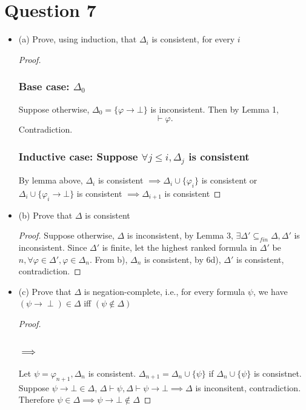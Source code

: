\documentclass{article}
\begin{document}
\section*{Question 7}
\begin{itemize}
    \item (a) Prove, using induction, that $\Delta_i$ is consistent, for every $i$
    \begin{proof}
        \subsubsection*{Base case: $\Delta_0$}
        Suppose otherwise, $\Delta_0=\{\varphi \rightarrow \bot\}$ is inconsistent. Then by Lemma 1, 
        \[
        \vdash \varphi.
        \]
        Contradiction.
        \subsubsection*{Inductive case: Suppose $\forall j \leq i, \Delta_j$ is consistent}
        By lemma above, $\Delta_i$ is consistent $\implies \Delta_i \cup \{\varphi_i\}$ is consistent or $\Delta_i \cup \{\varphi_i \rightarrow \bot\}$
        is consistent $\implies \Delta_{i+1}$ is consistent
    \end{proof}

    \item (b) Prove that $\Delta$ is consistent
    \begin{proof}
        Suppose otherwise, $\Delta$ is inconsistent, by Lemma 3, $\exists \Delta' \subseteq_{fin} \Delta, \Delta'$ is inconsistent. Since $\Delta'$ is finite, let the highest ranked formula in $\Delta'$
        be $n, \forall \varphi \in \Delta', \varphi \in \Delta_n$. From b), $\Delta_n$ is consistent, by 6d), $\Delta'$ is consistent, contradiction.
    \end{proof}
    \item (c) Prove that $\Delta$ is negation-complete, i.e., for every formula $\psi$, we have $(\psi \rightarrow \perp) \in \Delta$ iff $(\psi \notin \Delta)$
    \begin{proof}
        \subsubsection*{$\implies$}
        Let $\psi = \varphi_{n+1}, \Delta_{n}$ is consistent. $\Delta_{n+1} = \Delta_n \cup \{\psi\}$ if $\Delta_n \cup \{\psi\}$ is consistnet. Suppose $\psi \rightarrow \bot\in \Delta$, 
        $\Delta \vdash \psi, \Delta \vdash \psi \rightarrow \bot \implies \Delta$ is inconsitent, contradiction. Therefore $\psi \in \Delta \implies \psi \rightarrow \bot \notin \Delta$ 

\end{proof}
\end{itemize}
\end{document}

